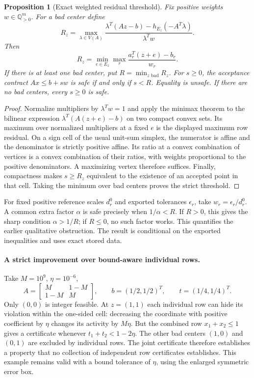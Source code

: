 \documentclass[11pt]{article}
\newtheorem{proposition}[theorem]{Proposition}
\begin{document}
\begin{proposition}[Exact weighted residual threshold]\label{prop:radius}
Fix positive weights $w\in\mathbb Q_{>0}^m$. For a bad center define
\[
 R_z=\max_{\lambda\in V(A)}
 \frac{\lambda^T(Az-b)-h_{E_z}(-A^T\lambda)}{\lambda^Tw}.
\]
Then
\[
 R_z=\min_{e\in E_z}\max_r\frac{a_r^T(z+e)-b_r}{w_r}.
\]
If there is at least one bad center, put $R=\min_{z\text{ bad}}R_z$.
For $s\ge0$, the acceptance contract $Ax\le b+s w$ is safe if and only if $s<R$.
Equality is unsafe. If there are no bad centers, every $s\ge0$ is safe.
\end{proposition}
\begin{proof}
Normalize multipliers by $\lambda^Tw=1$ and apply the minimax theorem to the
bilinear expression $\lambda^T(A(z+e)-b)$ on two compact convex sets. Its maximum
over normalized multipliers at a fixed $e$ is the displayed maximum row residual.
On a sign cell of the usual unit-sum simplex, the numerator is affine and the
denominator is strictly positive affine. Its ratio at a convex combination of
vertices is a convex combination of their ratios, with weights proportional to
the positive denominators. A maximizing vertex therefore suffices. Finally,
compactness makes $s\ge R_z$ equivalent to the existence of an accepted point in
that cell. Taking the minimum over bad centers proves the strict threshold.
\end{proof}
For fixed positive reference scales $d_r^0$ and exported tolerances $\epsilon_r$,
take $w_r=\epsilon_r/d_r^0$. A common extra factor $\alpha$ is safe precisely when
$1/\alpha<R$. If $R>0$, this gives the sharp condition $\alpha>1/R$; if $R\le0$,
no such factor works. This quantifies the earlier qualitative obstruction.
The result is conditional on the exported inequalities and uses exact stored data.

\paragraph{A strict improvement over bound-aware individual rows.}
Take $M=10^9$, $\eta=10^{-6}$,
\[
 A=\begin{bmatrix}M&1-M\\1-M&M\end{bmatrix},\qquad b=(1/2,1/2)^T,
 \qquad t=(1/4,1/4)^T.
\]
Only $(0,0)$ is integer feasible. At $z=(1,1)$ each individual row can hide its
violation within the one-sided cell: decreasing the coordinate with positive
coefficient by $\eta$ changes its activity by $M\eta$. But the combined row
$x_1+x_2\le1$ gives a certificate whenever $t_1+t_2<1-2\eta$.
The other bad centers $(1,0)$ and $(0,1)$ are excluded by individual rows. The
joint certificate therefore establishes a property that no collection of independent
row certificates establishes. This example remains valid with a bound tolerance
of $\eta$, using the enlarged symmetric error box.
\end{document}
